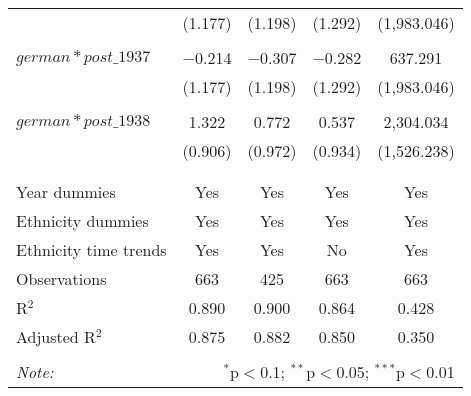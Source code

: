 \begin{table}[!htbp]
\begin{tabular}{@{\extracolsep{5pt}}lcccc}
  & (1.177) & (1.198) & (1.292) & (1,983.046) \\ 
  & & & & \\ 
 $german*post\_1937$ & $-$0.214 & $-$0.307 & $-$0.282 & 637.291 \\ 
  & (1.177) & (1.198) & (1.292) & (1,983.046) \\ 
  & & & & \\ 
 $german*post\_1938$ & 1.322 & 0.772 & 0.537 & 2,304.034 \\ 
  & (0.906) & (0.972) & (0.934) & (1,526.238) \\ 
  & & & & \\ 
\hline \\[-1.8ex] 
Year dummies & Yes & Yes & Yes & Yes \\ 
Ethnicity dummies & Yes & Yes & Yes & Yes \\ 
Ethnicity time trends & Yes & Yes & No & Yes \\ 
Observations & 663 & 425 & 663 & 663 \\ 
R$^{2}$ & 0.890 & 0.900 & 0.864 & 0.428 \\ 
Adjusted R$^{2}$ & 0.875 & 0.882 & 0.850 & 0.350 \\ 
\hline 
\hline \\[-1.8ex] 
\textit{Note:}  & \multicolumn{4}{r}{$^{*}$p$<$0.1; $^{**}$p$<$0.05; $^{***}$p$<$0.01} \\ 
\end{tabular} 
\end{table} 
